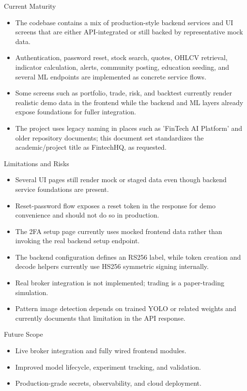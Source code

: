 \documentclass{beamer}
\begin{document}
\begin{frame}{Current Maturity}
\begin{itemize}
\item The codebase contains a mix of production-style backend services and UI screens that are either API-integrated or still backed by representative mock data.
\item Authentication, password reset, stock search, quotes, OHLCV retrieval, indicator calculation, alerts, community posting, education seeding, and several ML endpoints are implemented as concrete service flows.
\item Some screens such as portfolio, trade, risk, and backtest currently render realistic demo data in the frontend while the backend and ML layers already expose foundations for fuller integration.
\item The project uses legacy naming in places such as 'FinTech AI Platform' and older repository documents; this document set standardizes the academic/project title as FintechHQ, as requested.
\end{itemize}
\end{frame}
\begin{frame}{Limitations and Risks}
\begin{itemize}
\item Several UI pages still render mock or staged data even though backend service foundations are present.
\item Reset-password flow exposes a reset token in the response for demo convenience and should not do so in production.
\item The 2FA setup page currently uses mocked frontend data rather than invoking the real backend setup endpoint.
\item The backend configuration defines an RS256 label, while token creation and decode helpers currently use HS256 symmetric signing internally.
\item Real broker integration is not implemented; trading is a paper-trading simulation.
\item Pattern image detection depends on trained YOLO or related weights and currently documents that limitation in the API response.
\end{itemize}
\end{frame}
\begin{frame}{Future Scope}
\begin{itemize}
\item Live broker integration and fully wired frontend modules.
\item Improved model lifecycle, experiment tracking, and validation.
\item Production-grade secrets, observability, and cloud deployment.
\end{itemize}
\end{frame}
\end{document}
